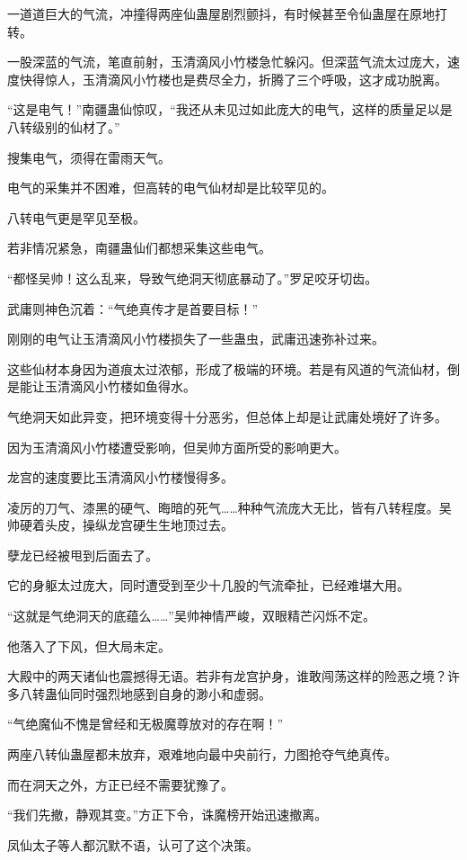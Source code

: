 \begin{this_body}
一道道巨大的气流，冲撞得两座仙蛊屋剧烈颤抖，有时候甚至令仙蛊屋在原地打转。

一股深蓝的气流，笔直前射，玉清滴风小竹楼急忙躲闪。但深蓝气流太过庞大，速度快得惊人，玉清滴风小竹楼也是费尽全力，折腾了三个呼吸，这才成功脱离。

“这是电气！”南疆蛊仙惊叹，“我还从未见过如此庞大的电气，这样的质量足以是八转级别的仙材了。”

搜集电气，须得在雷雨天气。

电气的采集并不困难，但高转的电气仙材却是比较罕见的。

八转电气更是罕见至极。

若非情况紧急，南疆蛊仙们都想采集这些电气。

“都怪吴帅！这么乱来，导致气绝洞天彻底暴动了。”罗足咬牙切齿。

武庸则神色沉着：“气绝真传才是首要目标！”

刚刚的电气让玉清滴风小竹楼损失了一些蛊虫，武庸迅速弥补过来。

这些仙材本身因为道痕太过浓郁，形成了极端的环境。若是有风道的气流仙材，倒是能让玉清滴风小竹楼如鱼得水。

气绝洞天如此异变，把环境变得十分恶劣，但总体上却是让武庸处境好了许多。

因为玉清滴风小竹楼遭受影响，但吴帅方面所受的影响更大。

龙宫的速度要比玉清滴风小竹楼慢得多。

凌厉的刀气、漆黑的硬气、晦暗的死气……种种气流庞大无比，皆有八转程度。吴帅硬着头皮，操纵龙宫硬生生地顶过去。

孽龙已经被甩到后面去了。

它的身躯太过庞大，同时遭受到至少十几股的气流牵扯，已经难堪大用。

“这就是气绝洞天的底蕴么……”吴帅神情严峻，双眼精芒闪烁不定。

他落入了下风，但大局未定。

大殿中的两天诸仙也震撼得无语。若非有龙宫护身，谁敢闯荡这样的险恶之境？许多八转蛊仙同时强烈地感到自身的渺小和虚弱。

“气绝魔仙不愧是曾经和无极魔尊放对的存在啊！”

两座八转仙蛊屋都未放弃，艰难地向最中央前行，力图抢夺气绝真传。

而在洞天之外，方正已经不需要犹豫了。

“我们先撤，静观其变。”方正下令，诛魔榜开始迅速撤离。

凤仙太子等人都沉默不语，认可了这个决策。


\end{this_body}
